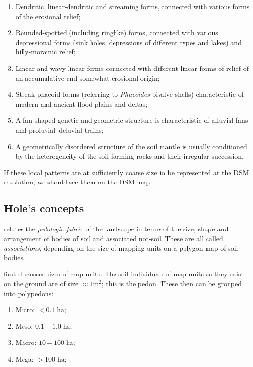 \documentclass[soil, manuscript]{copernicus}
\begin{document}
\begin{enumerate}
\item Dendritic, linear-dendritic and streaming forms, connected with various forms of the erosional relief;
\item  Rounded-spotted (including ringlike) forms, connected with various depressional forms (sink holes, depressions of different types and lakes) and hilly-morainic relief;
\item  Linear and wavy-linear forms connected with different linear forms of relief of an accumulative and somewhat erosional origin;
\item  Streak-phacoid forms (referring to \emph{Phacoides} bivalve shells)  characteristic of modern and ancient flood plains and deltas;
\item  A fan-shaped genetic and geometric structure is characteristic of alluvial fans and proluvial--deluvial trains;
\item A geometrically disordered structure of the soil mantle is usually conditioned by the heterogeneity of the soil-forming rocks and their irregular succession.
\end{enumerate}

If these local patterns are at sufficiently coarse size to be represented at the DSM resolution, we should see them on the DSM map.

\subsection{Hole's concepts}

\citet{holeSoilLandscapeAnalysis1985} relates the \emph{pedologic fabric} of the landscape in terms of the size, shape and arrangement of bodies of soil and associated not-soil.
%
These are all called \emph{associations}, depending on the size of mapping units on a polygon map of soil bodies.

\par
\citet[Table 5]{holeApproachLandscapeAnalysis1978} first discusses sizes of map units.
%
The soil individuals of map units as they exist on the ground are of size $\approx 1 \mathrm{m}^2$; this is the pedon.
%
These then can be grouped into polypedons:
%
\begin{enumerate}
\item Micro: $<0.1 \; \mathrm{ha}$;
\item Meso: $0.1 - 1.0 \;\mathrm{ha}$;
\item Macro: $10 - 100 \; \mathrm{ha}$;
\item Mega: $>100 \; \mathrm{ha}$;
\end{enumerate}
%
\end{document}
